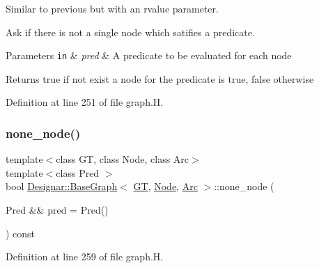 Similar to previous but with an rvalue parameter. 

Ask if there is not a single node which satifies a predicate.


\begin{DoxyParams}[1]{Parameters}
\mbox{\tt in}  & {\em pred} & A predicate to be evaluated for each node \\
\hline
\end{DoxyParams}
\begin{DoxyReturn}{Returns}
{\ttfamily true} if not exist a node for the predicate is true, {\ttfamily false} otherwise 
\end{DoxyReturn}


Definition at line 251 of file graph.\+H.

\mbox{\label{class_designar_1_1_base_graph_a394cdb81d0b0402e348dc87d2456d2d7}} 
\subsubsection{\texorpdfstring{none\+\_\+node()}{none\_node()}\hspace{0.1cm}{\footnotesize\ttfamily [2/2]}}
{\footnotesize\ttfamily template$<$class GT, class Node, class Arc$>$ \\
template$<$class Pred $>$ \\
bool \hyperlink{class_designar_1_1_base_graph}{Designar\+::\+Base\+Graph}$<$ \hyperlink{demo-buildgraph_8_c_a3001c40d2c31ca87ed96cd7d1334a55e}{GT}, \hyperlink{namespace_designar_a5af326c65aa2bd26b26c410f2030d09e}{Node}, \hyperlink{namespace_designar_a3f55fb5513d62ff47cbc8f72b8e95d6f}{Arc} $>$\+::none\+\_\+node (\begin{DoxyParamCaption}\item[{Pred \&\&}]{pred = {\ttfamily Pred()} }\end{DoxyParamCaption}) const\hspace{0.3cm}{\ttfamily [inline]}}



Definition at line 259 of file graph.\+H.

\mbox{\label{class_designar_1_1_base_graph_aa0047160fb8424fe88dc7c1785f66827}} 
